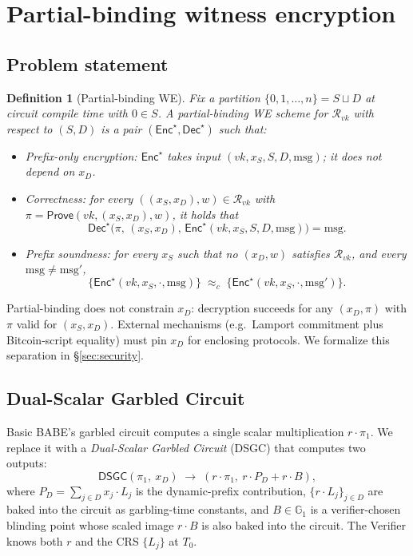 \documentclass[11pt]{article}
\newtheorem{definition}{Definition}
\newcommand{\Gone}{\mathbb{G}_1}
\newcommand{\msg}{\mathrm{msg}}
\newcommand{\Enc}{\mathsf{Enc}}
\newcommand{\Dec}{\mathsf{Dec}}
\begin{document}
\section{Partial-binding witness encryption}\label{sec:construction}

\subsection{Problem statement}

\begin{definition}[Partial-binding WE]\label{def:pbwe}
Fix a partition $\{0, 1, \ldots, n\} = S \sqcup D$ at circuit
compile time with $0 \in S$. A partial-binding WE scheme for
$\mathcal{R}_{vk}$ with respect to $(S, D)$ is a pair
$(\Enc^\star, \Dec^\star)$ such that:
\begin{itemize}
  \item \emph{Prefix-only encryption:} $\Enc^\star$ takes input
    $(vk, x_S, S, D, \msg)$; it does not depend on $x_D$.
  \item \emph{Correctness:} for every $((x_S, x_D), w) \in \mathcal{R}_{vk}$
    with $\pi = \mathsf{Prove}(vk, (x_S, x_D), w)$, it holds that
    \[
      \Dec^\star\bigl(\pi,\,(x_S, x_D),\,\Enc^\star(vk, x_S, S, D, \msg)\bigr) = \msg.
    \]
  \item \emph{Prefix soundness:} for every $x_S$ such that no
    $(x_D, w)$ satisfies $\mathcal{R}_{vk}$, and every $\msg \neq \msg'$,
    \[
      \{\Enc^\star(vk, x_S, \cdot, \msg)\}
      \;\approx_c\;
      \{\Enc^\star(vk, x_S, \cdot, \msg')\}.
    \]
\end{itemize}
\end{definition}

Partial-binding does not constrain $x_D$: decryption succeeds for
any $(x_D, \pi)$ with $\pi$ valid for $(x_S, x_D)$. External
mechanisms (e.g.\ Lamport commitment plus Bitcoin-script equality)
must pin $x_D$ for enclosing protocols. We formalize this separation
in \S\ref{sec:security}.

\subsection{Dual-Scalar Garbled Circuit}\label{sec:dsgc}

Basic BABE's garbled circuit computes a single scalar multiplication
$r \cdot \pi_1$. We replace it with a \emph{Dual-Scalar Garbled Circuit}
(DSGC) that computes two outputs:
\[
  \mathsf{DSGC}(\pi_1,\ x_D) \;\longrightarrow\;
  (r \cdot \pi_1,\ r \cdot P_D + r \cdot B),
\]
where $P_D = \sum_{j \in D} x_j \cdot L_j$ is the dynamic-prefix
contribution, $\{r \cdot L_j\}_{j \in D}$ are baked into the circuit
as garbling-time constants, and $B \in \Gone$ is a verifier-chosen
blinding point whose scaled image $r \cdot B$ is also baked into the
circuit. The Verifier knows both $r$ and the CRS $\{L_j\}$ at $T_0$.
\end{document}

